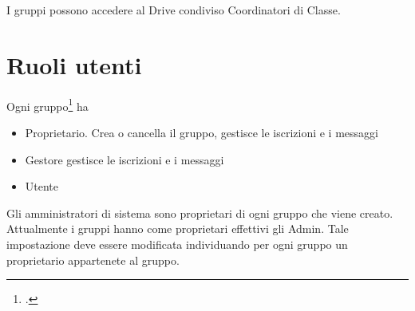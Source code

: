 I gruppi possono accedere al Drive condiviso Coordinatori di Classe.
\section{Ruoli utenti}
Ogni gruppo\footcite{Google2023e} ha 
\begin{itemize}
	\item Proprietario. Crea o cancella il gruppo, gestisce le iscrizioni e i messaggi 
	\item Gestore gestisce le iscrizioni e i messaggi
	\item Utente
\end{itemize}
Gli amministratori di sistema sono proprietari di ogni gruppo che viene creato. Attualmente i gruppi hanno come proprietari effettivi gli Admin. Tale impostazione deve essere modificata individuando per ogni gruppo un proprietario appartenete al gruppo.